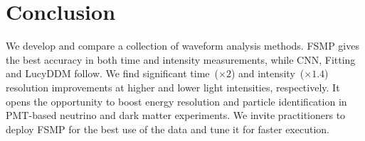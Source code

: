 \section{Conclusion}
\label{sec:conclusion}

We develop and compare a collection of waveform analysis methods.  FSMP gives the best accuracy in both time and intensity measurements, while CNN, Fitting and LucyDDM follow.  We find significant time~($\times 2$) and intensity~($\times 1.4$) resolution improvements at higher and lower light intensities, respectively.  It opens the opportunity to boost energy resolution and particle identification in PMT-based neutrino and dark matter experiments.  We invite practitioners to deploy FSMP for the best use of the data and tune it for faster execution.